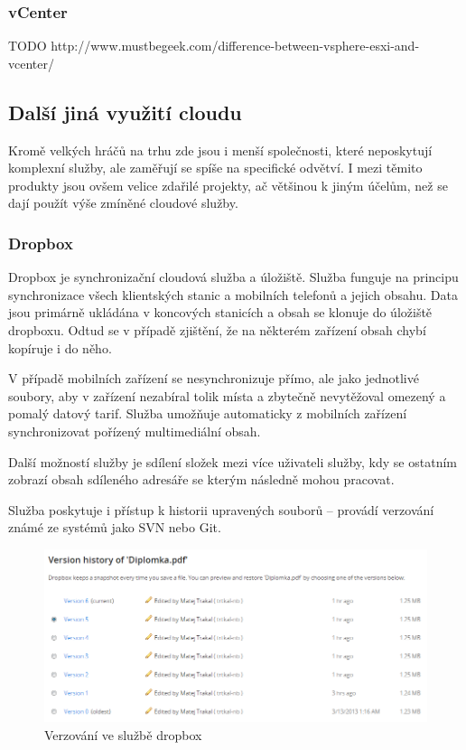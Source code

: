 \subsubsection{vCenter}
TODO
http://www.mustbegeek.com/difference-between-vsphere-esxi-and-vcenter/

\subsection{Další jiná využití cloudu}
Kromě velkých hráčů na trhu zde jsou i menší společnosti, které neposkytují komplexní služby, ale zaměřují se spíše na specifické odvětví. I mezi těmito produkty jsou ovšem velice zdařilé projekty, ač většinou k jiným účelům, než se dají použít výše zmíněné cloudové služby.

\subsubsection{Dropbox}
Dropbox je synchronizační cloudová služba a úložiště. Služba funguje na principu synchronizace všech klientských stanic a mobilních telefonů a jejich obsahu. Data jsou primárně ukládána v koncových stanicích a obsah se klonuje do úložiště dropboxu. Odtud se v případě zjištění, že na některém zařízení obsah chybí kopíruje i do něho. 

V případě mobilních zařízení se nesynchronizuje přímo, ale jako jednotlivé soubory, aby v zařízení nezabíral tolik místa a zbytečně nevytěžoval omezený a pomalý datový tarif. Služba umožňuje automaticky z mobilních zařízení synchronizovat pořízený multimediální obsah.

Další možností služby je sdílení složek mezi více uživateli služby, kdy se ostatním zobrazí obsah sdíleného adresáře se kterým následně mohou pracovat.

Služba poskytuje i přístup k historii upravených souborů -- provádí verzování známé ze systémů jako SVN nebo Git.

\begin{figure}[htbp]
	\centering
		\includegraphics[width=1.00\textwidth]{ext/dropbox_versioning.png}
	\caption{Verzování ve službě dropbox}
	\label{fig:dropbox_versioning}
\end{figure}


